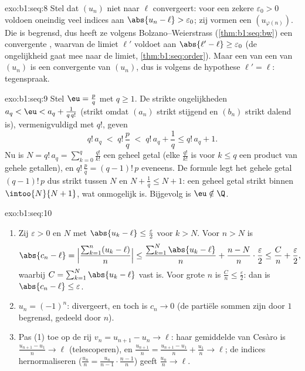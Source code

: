 \begin{solution}{exo:b1:seq:8}
Stel dat $(u_n)$ niet naar $\ell$ convergeert: voor een zekere
$\varepsilon_0 > 0$ voldoen oneindig veel indices aan $\abs{u_n - \ell} >
\varepsilon_0$; zij vormen een  $(u_{\varphi(n)})$. Die  is
begrensd, dus heeft ze volgens Bolzano--Weierstrass
(\cref{thm:b1:seq:bw}) een convergente , waarvan de limiet $\ell'$
voldoet aan $\abs{\ell' - \ell} \geq \varepsilon_0$ (de ongelijkheid gaat
mee naar de limiet, \cref{thm:b1:seq:order}). Maar een  van een
 van $(u_n)$ is een convergente  van $(u_n)$, dus is
volgens de hypothese $\ell' = \ell$: tegenspraak.
\end{solution}

\begin{solution}{exo:b1:seq:9}
Stel $\eu = \frac pq$ met $q \geq 1$. De strikte ongelijkheden $a_q < \eu
< a_q + \frac{1}{q\,q!}$ (strikt omdat $(a_n)$ strikt stijgend en $(b_n)$
strikt dalend is), vermenigvuldigd met $q!$, geven
\[
q!\,a_q \;<\; q!\,\frac pq \;<\; q!\,a_q + \frac 1q \leq q!\,a_q + 1.
\]
Nu is $N = q!\,a_q = \sum_{k=0}^{q} \frac{q!}{k!}$ een geheel getal (elke
$\frac{q!}{k!}$ is voor $k \leq q$ een product van gehele getallen), en
$q!\,\frac pq = (q-1)!\,p$ eveneens. De formule legt het gehele getal
$(q-1)!\,p$ dus strikt tussen $N$ en $N + \frac 1q \leq N + 1$: een
geheel getal strikt binnen $\intoo{N}{N+1}$, wat onmogelijk is. Bijgevolg
is $\eu \notin \Q$.
\end{solution}

\begin{solution}{exo:b1:seq:10}
\begin{enumerate}
  \item Zij $\varepsilon > 0$ en $N$ met $\abs{u_k - \ell} \leq
        \frac{\varepsilon}{2}$ voor $k > N$. Voor $n > N$ is
        \[
        \abs{c_n - \ell}
        = \Bigl|\frac{\sum_{k=1}^{n}(u_k - \ell)}{n}\Bigr|
        \leq \frac{\sum_{k=1}^{N} \abs{u_k - \ell}}{n}
        + \frac{n - N}{n}\cdot\frac{\varepsilon}{2}
        \leq \frac{C}{n} + \frac{\varepsilon}{2},
        \]
        waarbij $C = \sum_{k=1}^N \abs{u_k - \ell}$ vast is. Voor grote
        $n$ is $\frac Cn \leq \frac\varepsilon2$: dan is $\abs{c_n -
        \ell} \leq \varepsilon$.
  \item $u_n = (-1)^n$: divergeert, en toch is $c_n \to 0$ (de partiële
        sommen zijn door $1$ begrensd, gedeeld door $n$).
  \item Pas (1) toe op de rij $v_n = u_{n+1} - u_n \to \ell$: haar
        gemiddelde van Cesàro is $\frac{u_{n+1} - u_1}{n} \to \ell$
        (telescoperen), en $\frac{u_{n+1}}{n} = \frac{u_{n+1} - u_1}{n}
        + \frac{u_1}{n} \to \ell$; de indices hernormaliseren
        ($\frac{u_n}{n} = \frac{u_n}{n-1}\cdot\frac{n-1}{n}$) geeft
        $\frac{u_n}{n} \to \ell$.
\end{enumerate}
\end{solution}

